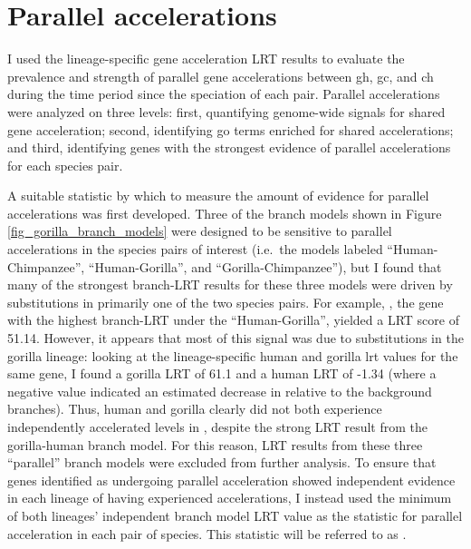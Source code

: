 \section{Parallel accelerations}
\label{sec_parallel_accel}

I used the lineage-specific gene acceleration LRT results to evaluate
the prevalence and strength of parallel gene accelerations between
\ac{gh}, \ac{gc}, and \ac{ch} during the time period since the
speciation of each pair. Parallel accelerations were analyzed on
three levels: first, quantifying genome-wide signals for shared gene
acceleration; second, identifying \ac{go} terms enriched for shared
accelerations; and third, identifying genes with the strongest
evidence of parallel accelerations for each species pair.

A suitable statistic by which to measure the amount of evidence for
parallel accelerations was first developed. Three of the branch models
shown in Figure \ref{fig_gorilla_branch_models} were designed to be
sensitive to parallel accelerations in the species pairs of interest
(i.e.\ the models labeled ``Human-Chimpanzee'', ``Human-Gorilla'', and
``Gorilla-Chimpanzee''), but I found that many of the strongest
branch-LRT results for these three models were driven by \nsyn
substitutions in primarily one of the two species pairs. For example,
, the gene with the highest branch-LRT under the
``Human-Gorilla'', yielded a LRT score of 51.14. However, it appears
that most of this signal was due to substitutions in the gorilla
lineage: looking at the lineage-specific human and gorilla \ac{lrt}
values for the same gene, I found a gorilla LRT of 61.1 and a human
LRT of -1.34 (where a negative value indicated an estimated decrease
in \dnds relative to the background branches). Thus, human and gorilla
clearly did not both experience independently accelerated \dnds levels
in , despite the strong LRT result from the
gorilla-human branch model. For this reason, LRT results from these
three ``parallel'' branch models were excluded from further
analysis. To ensure that genes identified as undergoing parallel
acceleration showed independent evidence in each lineage of having
experienced \dnds accelerations, I instead used the minimum of both
lineages' independent branch model LRT value as the statistic for
parallel acceleration in each pair of species. This statistic will be
referred to as \lrtmin.


